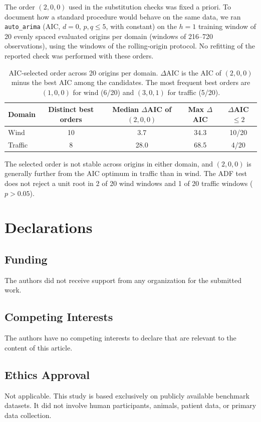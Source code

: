 \documentclass[pdflatex]{sn-jnl}
\begin{document}
The order $(2,0,0)$ used in the substitution checks was fixed a priori. To
document how a standard procedure would behave on the same data, we ran
\texttt{auto\_arima} (AIC, $d=0$, $p,q\le5$, with constant) on the $h=1$
training window of 20 evenly spaced evaluated origins per domain (windows of
216--720 observations), using the windows of the rolling-origin protocol.
No refitting of the reported check was performed with these orders.
\begin{table}[h]
\centering
\small
\begin{tabular}{@{}lcccc@{}}
\toprule
Domain & Distinct best orders & Median $\Delta$AIC of $(2,0,0)$ & Max $\Delta$AIC & $\Delta$AIC $\le 2$ \\
\midrule
Wind & 10 & 3.7 & 34.3 & 10/20 \\
Traffic & 8 & 28.0 & 68.5 & 4/20 \\
\bottomrule
\end{tabular}
\caption{AIC-selected order across 20 origins per domain. $\Delta$AIC is the AIC of
$(2,0,0)$ minus the best AIC among the candidates. The most frequent best orders
are $(1,0,0)$ for wind (6/20) and $(3,0,1)$ for traffic (5/20).}
\label{tab:arima-order}
\end{table}
The selected order is not stable across origins in either domain, and
$(2,0,0)$ is generally further from the AIC optimum in traffic than in wind.
The ADF test does not reject a unit root in 2 of 20 wind windows and 1 of 20
traffic windows ($p>0.05$).

\section*{Declarations}

\subsection*{Funding}
The authors did not receive support from any organization for the submitted work.

\subsection*{Competing Interests}
The authors have no competing interests to declare that are relevant to the content of this article.

\subsection*{Ethics Approval}
Not applicable. This study is based exclusively on publicly available benchmark datasets. It did not involve human participants, animals, patient data, or primary data collection.
\end{document}
